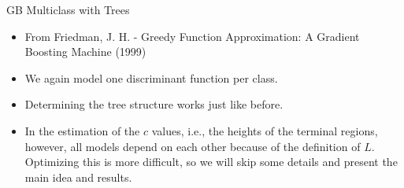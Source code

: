 \documentclass[11pt,compress,t,notes=noshow, xcolor=table]{beamer}
\begin{document}
\begin{vbframe}{GB Multiclass with Trees}

\begin{itemize}
  \item From Friedman, J. H. - Greedy Function Approximation: A Gradient Boosting Machine (1999)
  \item We again model one discriminant function per class.    
  \item Determining the tree structure works just like before.
\item In the estimation of the $c$ values, i.e., the heights of the terminal regions, however, all models depend on each other because of the definition
of $L$. Optimizing this is more difficult, so we will skip some details and present the main idea and results.
\end{itemize}

\framebreak









\end{vbframe}
\end{document}
